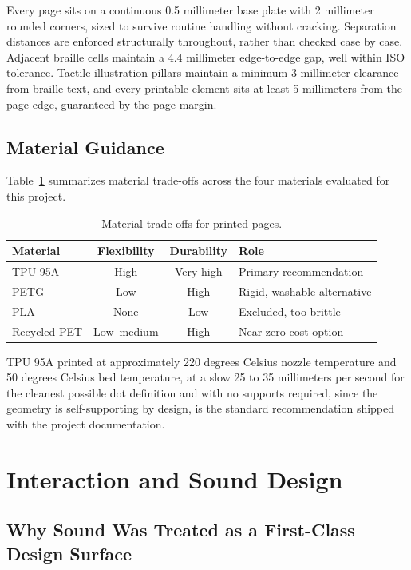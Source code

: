 \documentclass[conference]{IEEEtran}
\begin{document}
Every page sits on a continuous 0.5 millimeter base plate with 2 millimeter rounded corners, sized to survive routine handling without cracking. Separation distances are enforced structurally throughout, rather than checked case by case. Adjacent braille cells maintain a 4.4 millimeter edge-to-edge gap, well within ISO tolerance. Tactile illustration pillars maintain a minimum 3 millimeter clearance from braille text, and every printable element sits at least 5 millimeters from the page edge, guaranteed by the page margin.

\subsection{Material Guidance}

Table~\ref{tab:materials} summarizes material trade-offs across the four materials evaluated for this project.

\begin{table}[t]
\caption{Material trade-offs for printed pages.}
\label{tab:materials}
\centering
\begin{tabular}{lccl}
\toprule
Material & Flexibility & Durability & Role \\
\midrule
TPU 95A & High & Very high & Primary recommendation \\
PETG & Low & High & Rigid, washable alternative \\
PLA & None & Low & Excluded, too brittle \\
Recycled PET & Low--medium & High & Near-zero-cost option \\
\bottomrule
\end{tabular}
\end{table}

TPU 95A printed at approximately 220 degrees Celsius nozzle temperature and 50 degrees Celsius bed temperature, at a slow 25 to 35 millimeters per second for the cleanest possible dot definition and with no supports required, since the geometry is self-supporting by design, is the standard recommendation shipped with the project documentation.

\section{Interaction and Sound Design}\label{sec:sound}

\subsection{Why Sound Was Treated as a First-Class Design Surface}
\end{document}
